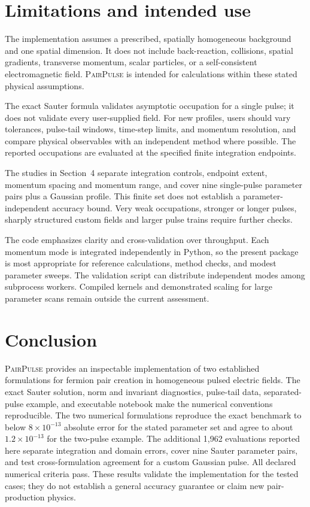\documentclass[a4paper,fleqn]{cas-dc}
\newcommand{\PairPulse}{\textsc{PairPulse}}
\begin{document}
\section{Limitations and intended use}

The implementation assumes a prescribed, spatially homogeneous background and one spatial dimension. It does not include back-reaction, collisions, spatial gradients, transverse momentum, scalar particles, or a self-consistent electromagnetic field. \PairPulse{} is intended for calculations within these stated physical assumptions.

The exact Sauter formula validates asymptotic occupation for a single pulse; it does not validate every user-supplied field. For new profiles, users should vary tolerances, pulse-tail windows, time-step limits, and momentum resolution, and compare physical observables with an independent method where possible. The reported occupations are evaluated at the specified finite integration endpoints.

The studies in Section~4 separate integration controls, endpoint extent, momentum spacing and momentum range, and cover nine single-pulse parameter pairs plus a Gaussian profile. This finite set does not establish a parameter-independent accuracy bound. Very weak occupations, stronger or longer pulses, sharply structured custom fields and larger pulse trains require further checks.


The code emphasizes clarity and cross-validation over throughput. Each momentum mode is integrated independently in Python, so the present package is most appropriate for reference calculations, method checks, and modest parameter sweeps. The validation script can distribute independent modes among subprocess workers. Compiled kernels and demonstrated scaling for large parameter scans remain outside the current assessment.

\section{Conclusion}

\PairPulse{} provides an inspectable implementation of two established formulations for fermion pair creation in homogeneous pulsed electric fields. The exact Sauter solution, norm and invariant diagnostics, pulse-tail data, separated-pulse example, and executable notebook make the numerical conventions reproducible. The two numerical formulations reproduce the exact benchmark to below $8\times10^{-13}$ absolute error for the stated parameter set and agree to about $1.2\times10^{-13}$ for the two-pulse example. The additional 1,962 evaluations reported here separate integration and domain errors, cover nine Sauter parameter pairs, and test cross-formulation agreement for a custom Gaussian pulse. All declared numerical criteria pass. These results validate the implementation for the tested cases; they do not establish a general accuracy guarantee or claim new pair-production physics.
\end{document}
